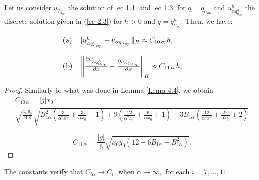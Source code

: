 \documentclass[axioms,article,submit,moreauthors]{Definitions/mdpi}
\newcommand\pder[2][]{\ensuremath{\tfrac{\partial#1}{\partial#2}}}
\begin{document}
\begin{Lemma} Let us consider $u_{q_{\alpha_{op}}}$ the solution of \eqref{ec 1.1} and \eqref{ec 1.3} for $q= q_{\alpha_{op}}$ and ${u^h_{\alpha q^h_{\alpha_{op}}}}$ the discrete solution  given in (\ref{ec 2.3}) for  $h>0$ and $q={ q^h_{\alpha_{op}}}$. Then, we have:
						
	 \begin{equation}\begin{array}{ll} \label{difu-problema2alpha} {\rm (a)} \quad  			      
  				  \lVert {u^h_{\alpha q^h_{\alpha_{op}}}} - u_{\alpha q_{\alpha_{op}}}  \rVert _H \approx C_{10\,\alpha}\, h,
  \qquad \qquad \\
  \\
     {\rm (b)}\quad
        \left\lVert \pder[{u^h_{\alpha q^h_{\alpha_{op}}}}]{x} - \pder[u_{\alpha q_{\alpha_{op}}}]{x} \right\rVert _H \approx C_{11\, \alpha} \,h,
        \end{array}
\end{equation}
   \end{Lemma}
   
   \begin{proof} Similarly to what was done in Lemma \ref{Lema 4.4}, we obtain
   \[\begin{array}{ll}
   C_{10\, \alpha}=|g|x_0\\
    \sqrt{\tfrac{x_0 y_0}{108}} \sqrt{B_{1\alpha}^2 \left( \tfrac{3}{\alpha^2 x_0^2}+\tfrac{3}{\alpha x_0}+1\right)+9\left(\tfrac{12}{\alpha^2 x_0^2}+\tfrac{6}{\alpha x_0}+1 \right)-3B_{1\alpha}\left( \tfrac{12}{\alpha^2 x_0^2}+\tfrac{9}{\alpha x_0}+2\right)}\end{array}\]
   
   
      \[C_{11\, \alpha}=\frac{|g|}{6} \sqrt{ x_0 y_0 (12-6B_{1\alpha}+B_{1\alpha}^2)}.\]
   \end{proof}
   
\begin{Remark}
The constants verify that \mbox{$C_{i\alpha}\to C_i$}, when $ \alpha\to\infty, $ for each $ i=7,\dots,11.$
\end{Remark}
\end{document}
